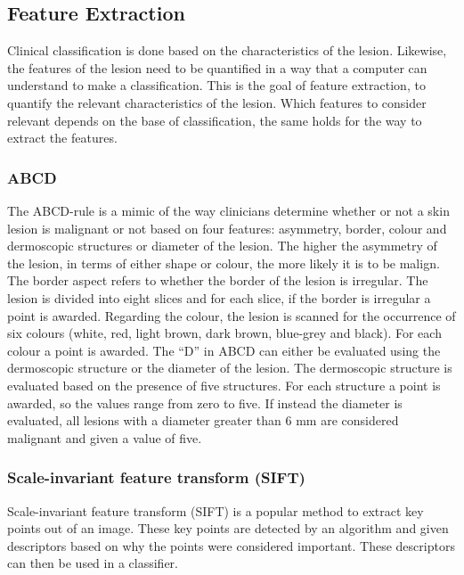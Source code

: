 \documentclass{kththesis}
\begin{document}
\subsection{Feature Extraction}

Clinical classification is done based on the characteristics of the lesion. Likewise, the features of the lesion need to be quantified in a way that a computer can understand to make a classification. This is the goal of feature extraction, to quantify the relevant characteristics of the lesion. Which features to consider relevant depends on the base of classification, the same holds for the way to extract the features.

\subsubsection{ABCD}

The ABCD-rule is a mimic of the way clinicians determine whether or not a skin lesion is malignant or not based on four features: asymmetry, border, colour and dermoscopic structures or diameter of the lesion. The higher the asymmetry of the lesion, in terms of either shape or colour, the more likely it is to be malign. The border aspect refers to whether the border of the lesion is irregular. The lesion is divided into eight slices and for each slice, if the border is irregular a point is awarded. Regarding the colour, the lesion is scanned for the occurrence of six colours (white, red, light brown, dark brown, blue-grey and black). For each colour a point is awarded. The “D” in ABCD can either be evaluated using the dermoscopic structure or the diameter of the lesion. The dermoscopic structure is evaluated based on the presence of five structures. For each structure a point is awarded, so the values range from zero to five. If instead the diameter is evaluated, all lesions with a diameter greater than 6 mm are considered malignant and given a value of five. \parencite{smaoui2013developed} \parencite{https://doi.org/10.1049/iet-ipr.2015.0385}

\subsubsection{Scale-invariant feature transform (SIFT)}

Scale-invariant feature transform (SIFT) is a popular method to extract key points out of an image. These key points are detected by an algorithm and given descriptors based on why the points were considered important. These descriptors can then be used in a classifier.
\end{document}
